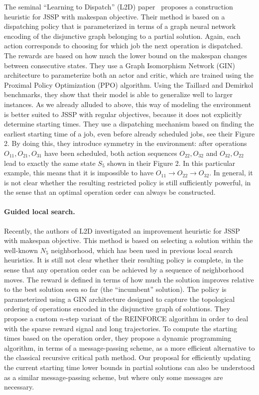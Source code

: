 \documentclass[a4paper]{report}
\theoremstyle{definition}
\theoremstyle{plain}
\begin{document}
The seminal ``Learning to Dispatch'' (L2D)
paper~\cite{zhangLearningDispatchJob2020} proposes a construction heuristic for
JSSP with makespan objective. Their method is based on a dispatching policy that
is parameterized in terms of a graph neural network encoding of the disjunctive
graph belonging to a partial solution. Again, each action corresponds to
choosing for which job the next operation is dispatched. The rewards are based
on how much the lower bound on the makespan changes between consecutive states.
They use a Graph Isomorphism Network (GIN) architecture to parameterize both an
actor and critic, which are trained using the Proximal Policy Optimization (PPO)
algorithm. Using the Taillard and Demirkol benchmarks, they show that their
model is able to generalize well to larger instances.
As we already alluded to above, this way of modeling the environment is better
suited to JSSP with regular objectives, because it does not explicitly determine
starting times.
%
They use a dispatching mechanism based on finding the earliest starting time of
a job, even before already scheduled jobs, see their Figure 2. By doing this,
they introduce symmetry in the environment: after operations
$O_{11}, O_{21}, O_{31}$ have been scheduled, both action sequences
$O_{22}, O_{32}$ and $O_{32}, O_{22}$ lead to exactly the same state $S_5$ shown
in their Figure 2. In this particular example, this means that it is impossible
to have $O_{11} \rightarrow O_{22} \rightarrow O_{32}$. In general, it is not
clear whether the resulting restricted policy is still sufficiently powerful, in
the sense that an optimal operation order can always be constructed.


\paragraph{Guided local search.}
Recently, the authors of L2D investigated an improvement heuristic for
JSSP~\cite{zhangDeepReinforcementLearning2024} with makespan objective.
%
This method is based on selecting a solution within the well-known $N_5$
neighborhood, which has been used in previous local search heuristics.
%
It is still not clear whether their resulting policy is complete, in the sense
that any operation order can be achieved by a sequence of neighborhood moves.
%
The reward is defined in terms of how much the solution improves relative to the
best solution seen so far (the ``incumbent'' solution). The policy is
parameterized using a GIN architecture designed to capture the topological
ordering of operations encoded in the disjunctive graph of solutions. They
propose a custom $n$-step variant of the REINFORCE algorithm in order to deal
with the sparse reward signal and long trajectories.
%
To compute the starting times based on the operation order, they propose a
dynamic programming algorithm, in terms of a message-passing scheme, as a more
efficient alternative to the classical recursive critical path method.
%
Our proposal for efficiently updating the current starting time lower bounds in
partial solutions can also be understood as a similar message-passing scheme,
but where only some messages are necessary.
\end{document}

